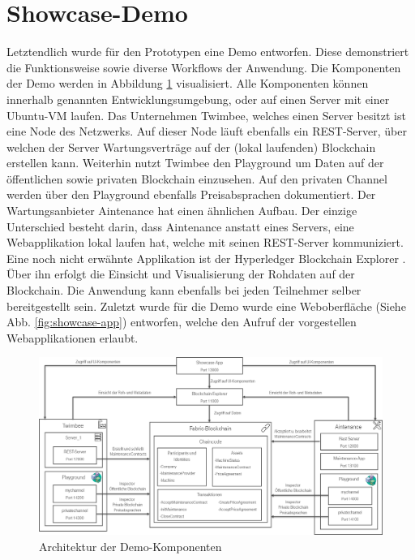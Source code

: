 \section{Showcase-Demo}
Letztendlich wurde für den Prototypen eine Demo entworfen. Diese demonstriert die Funktionsweise sowie diverse Workflows der Anwendung. Die Komponenten der Demo werden in Abbildung \ref{fig:architecture-showcase} visualisiert. Alle Komponenten können innerhalb genannten Entwicklungsumgebung, oder auf einen Server mit einer Ubuntu-VM laufen. Das Unternehmen Twimbee, welches einen Server besitzt ist eine Node des Netzwerks. Auf dieser Node läuft ebenfalls ein REST-Server, über welchen der Server Wartungsverträge auf der (lokal laufenden) Blockchain erstellen kann. Weiterhin nutzt Twimbee den Playground um Daten auf der öffentlichen sowie privaten Blockchain einzusehen. Auf den privaten Channel werden über den Playground ebenfalls Preisabsprachen dokumentiert. Der Wartungsanbieter Aintenance hat einen ähnlichen Aufbau. Der einzige Unterschied besteht darin, dass Aintenance anstatt eines Servers, eine Webapplikation lokal laufen hat, welche mit seinen REST-Server kommuniziert. Eine noch nicht erwähnte Applikation ist der Hyperledger Blockchain Explorer \cite{HyperledgerBlockchainExplorerTeamHyperledgerBlockchainExplorer2018}. Über ihn erfolgt die Einsicht und Visualisierung der Rohdaten auf der Blockchain. Die Anwendung kann ebenfalls bei jeden Teilnehmer selber bereitgestellt sein. Zuletzt wurde für die Demo wurde eine Weboberfläche (Siehe Abb. \ref{fig:showcase-app}) entworfen, welche den Aufruf der vorgestellen Webapplikationen erlaubt.

\begin{figure}[!htbp]
    \centering
      \includegraphics[width=1.0\textwidth,angle=0]{images/architecture_showcase}
       \caption{Architektur der Demo-Komponenten}
      \label{fig:architecture-showcase}
\end{figure}

